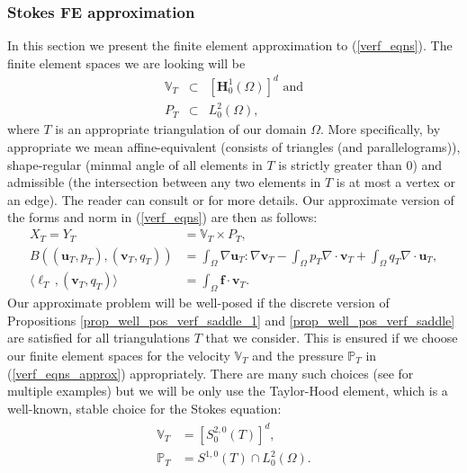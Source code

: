 \documentclass[12pt,a4paper]{article}
\theoremstyle{definition}
\begin{document}
\subsubsection{Stokes FE approximation}
In this section we present the finite element approximation to (\ref{verf_eqns}).  The finite element spaces we are looking will be
\begin{eqnarray}
	\mathbb{V}_T&\subset&\left[\textbf{H}^1_0\left(\Omega\right)\right]^d \text{ and}\nonumber\\
	P_T&\subset& L^2_0\left(\Omega\right),\nonumber
\end{eqnarray}
where $T$ is an appropriate triangulation of our domain $\Omega$.  More specifically, by appropriate we mean affine-equivalent (consists of triangles (and parallelograms)), shape-regular (minmal angle of all elements in $T$ is strictly greater than $0$)  and admissible (the intersection between any two elements in $T$ is at most a vertex or an edge).  The reader can consult \cite{verfurth2013posteriori} or \cite{brenner2007mathematical} for more details.
Our approximate version of the forms and norm in (\ref{verf_eqns}) are then as follows:
\begin{equation}\label{verf_eqns_approx}
\begin{aligned}
X_T=Y_T&=\mathbb{V}_T\times P_T,\\
B\left(\left(\textbf{u}_T,p_T\right),\left(\textbf{v}_T,q_T\right)\right)&=\int_{\Omega}\nabla \textbf{u}_T : \nabla \textbf{v}_T - \int_{\Omega} p_T \nabla\cdot\textbf{v}_T + \int_{\Omega} q_T \nabla\cdot\textbf{u}_T,\\
\langle \ell_T\,,\left(\textbf{v}_T,q_T\right) \rangle &= \int_{\Omega}\textbf{f}\cdot \textbf{v}_T.
\end{aligned}
\end{equation}
Our approximate problem will be well-posed if the discrete version of Propositions \ref{prop_well_pos_verf_saddle_1} and \ref{prop_well_pos_verf_saddle} are satisfied for all triangulations $T$ that we consider.  This is ensured if we choose our finite element spaces for the velocity $\mathbb{V}_T$ and the pressure $\mathbb{P}_T$ in (\ref{verf_eqns_approx}) appropriately.
There are many such choices (see \cite[\S 4.10.2]{verfurth2013posteriori} for multiple examples) but we will be only use the Taylor-Hood element, which is a well-known, stable choice for the Stokes equation:
\begin{eqnarray}
\begin{aligned}
\mathbb{V}_T&=\left[S^{2,0}_0\left(T\right)\right]^d,\\
\mathbb{P}_T&=S^{1,0}\left(T\right)\cap L^2_0\left(\Omega\right).
\end{aligned}
\end{eqnarray}
\end{document}
